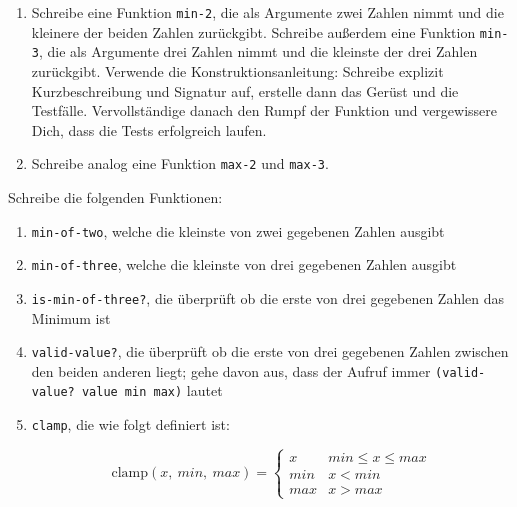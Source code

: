 \begin{aufgabe}

  \begin{enumerate}

  \item Schreibe eine Funktion \texttt{min-2}, die als Argumente zwei
    Zahlen nimmt und die kleinere der beiden Zahlen zurückgibt.  Schreibe
    außerdem eine Funktion \texttt{min-3}, die als Argumente drei
    Zahlen nimmt und die kleinste der drei Zahlen zurückgibt.  Verwende
    die Konstruktionsanleitung: Schreibe
    explizit Kurzbeschreibung und Signatur auf, erstelle dann das
    Gerüst und die Testfälle.  Vervollständige danach den Rumpf der
    Funktion und vergewissere Dich, dass die Tests erfolgreich laufen.
    
  \item Schreibe analog eine Funktion \texttt{max-2} und \texttt{max-3}.
    
  \end{enumerate}
\end{aufgabe}

\begin{aufgabe}
  Schreibe die folgenden Funktionen:
  \begin{enumerate}
  \item \texttt{min-of-two}, welche die kleinste von zwei
    gegebenen Zahlen ausgibt
  \item \texttt{min-of-three}, welche die kleinste von drei
    gegebenen Zahlen ausgibt
  \item \texttt{is-min-of-three?}, die überprüft ob die erste
    von drei gegebenen Zahlen das Minimum ist
  \item \texttt{valid-value?}, die überprüft ob die erste von
    drei gegebenen Zahlen zwischen den beiden anderen liegt; gehe
    davon aus, dass der Aufruf immer \texttt{(valid-value? value min max)}
    lautet 
  \item \texttt{clamp}, die wie folgt definiert ist:
    
    \[\text{clamp}(x,\ min,\ max)=
    \begin{cases} 
      x & min \leq x \leq max\\ 
      min & x < min \\ 
      max & x > max 
    \end{cases}
    \]
    
  \end{enumerate}
\end{aufgabe}

